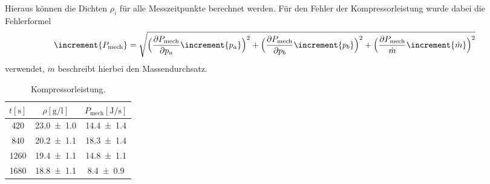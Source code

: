 Hieraus können die Dichten $\rho_i$ für alle Messzeitpunkte berechnet werden.
Für den Fehler der Kompressorleistung wurde dabei die Fehlerformel
\begin{equation}
\increment{P_{\text{mech}}} = \sqrt{\Bigl(\frac{\partial P_{\text{mech}}}{\partial p_a}\increment{p_a}\Bigr)^2 + \Bigl( \frac{\partial P_{\text{mech}}}{\partial p_b}\increment{p_b}\Bigr)^2 + \Bigl( \frac{\partial P_{\text{mech}}}{\dot{m}} \increment{\dot{m}}  \Bigr)^2}
\end{equation}
verwendet, $\dot{m}$ beschreibt hierbei den Massendurchsatz.

\begin{table}
  \centering
  \caption{Kompressorleistung.}
  \label{tab:tabelle5}
\begin{tabular}{c c c}
  \toprule
  {$t [\si{\second}]$} & {$\rho [\si{\gram\per\litre}]$} & {$P_{\text{mech}} [\si{\joule\per\second}]$}\\
  \midrule
  \num{420} & \num{23.0 +- 1.0} & \num{14.4 +- 1.4} \\
  \num{840} & \num{20.2 +- 1.1} & \num{18.3 +- 1.4} \\
  \num{1260} & \num{19.4 +- 1.1} & \num{14.8 +- 1.1} \\
  \num{1680} & \num{18.8 +- 1.1} & \num{8.4 +- 0.9} \\
  \bottomrule
\end{tabular}
\end{table}
